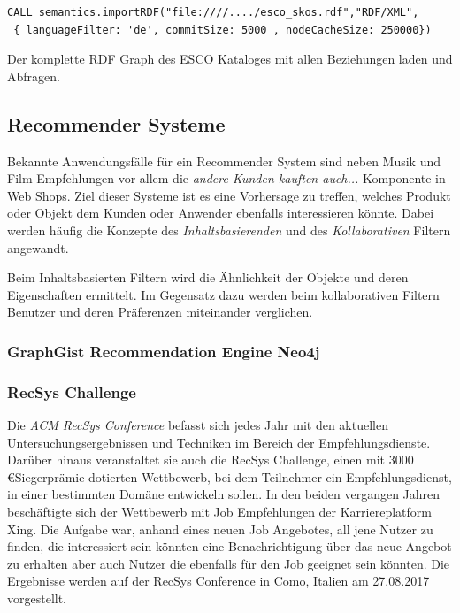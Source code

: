 \begin{lstlisting}[frame=htrbl, caption={Das Listing zeigt einen Funktionsaufruf über die Neo4j}, label={lst:result2}]
CALL semantics.importRDF("file:////..../esco_skos.rdf","RDF/XML",
 { languageFilter: 'de', commitSize: 5000 , nodeCacheSize: 250000})	
\end{lstlisting}

Der komplette RDF Graph des ESCO Kataloges mit allen Beziehungen laden und Abfragen.


\subsection{Recommender Systeme}

Bekannte Anwendungsfälle für ein Recommender System sind neben Musik und Film Empfehlungen vor allem die \textit{andere Kunden kauften auch...} Komponente in Web Shops. Ziel dieser Systeme ist es eine Vorhersage zu treffen, welches Produkt oder Objekt dem Kunden oder Anwender ebenfalls interessieren könnte. Dabei werden häufig die Konzepte des \textit{Inhaltsbasierenden} und des \textit{Kollaborativen} Filtern angewandt. 

Beim Inhaltsbasierten Filtern wird die Ähnlichkeit der Objekte und deren Eigenschaften ermittelt. Im Gegensatz dazu werden beim kollaborativen Filtern Benutzer und deren Präferenzen miteinander verglichen. 


\subsubsection{GraphGist Recommendation Engine Neo4j}

\subsubsection{RecSys Challenge}

Die \textit{ACM RecSys Conference} befasst sich jedes Jahr mit den aktuellen Untersuchungsergebnissen und Techniken im Bereich der Empfehlungsdienste. Darüber hinaus veranstaltet sie auch die RecSys Challenge, einen mit 3000 \euro  Siegerprämie dotierten Wettbewerb, bei dem Teilnehmer ein Empfehlungsdienst, in einer bestimmten Domäne entwickeln sollen. In den beiden vergangen Jahren beschäftigte sich der Wettbewerb mit Job Empfehlungen der Karriereplatform Xing. Die Aufgabe war, anhand eines neuen Job Angebotes, all jene Nutzer zu finden, die interessiert sein könnten eine Benachrichtigung über das neue Angebot zu erhalten aber auch Nutzer die ebenfalls für den Job geeignet sein könnten. Die Ergebnisse werden auf der RecSys Conference in Como, Italien am 27.08.2017 vorgestellt.
